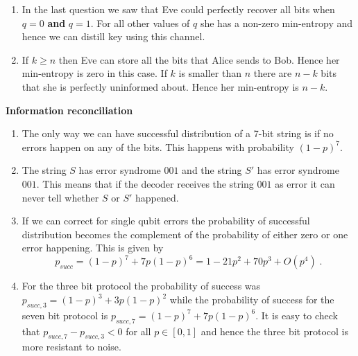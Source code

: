 \begin{exercises}
\begin{enumerate}
\item In the last question we saw that Eve could perfectly recover all bits when \(q=0\) {\bf and} \(q=1\). For all other values of \(q\) she has a non-zero min-entropy and hence we can distill key using this channel.

\item If \(k\geq n\) then Eve can store all the bits that Alice sends to Bob. Hence her min-entropy is zero in this case. If \(k\) is smaller than \(n\) there are \(n-k\) bits that she is perfectly uninformed about. Hence her min-entropy is \(n-k\).
\end{enumerate}


\item {\bf Information reconciliation}

\begin{enumerate}
\item The only way we can have successful distribution of a 7-bit string is if no errors happen on any of the bits. This happens with probability \((1-p)^7\).

\item The string \(S\) has error syndrome \(001\) and the string \(S'\) has error syndrome \(001\). This means that if the decoder receives the string \(001\) as error it can never tell whether \(S\) or \(S'\) happened.

\item If we can correct for single qubit errors the probability of successful distribution becomes the complement of the probability of either zero or one error happening. This is given by \[p_{succ} = (1-p)^7 + 7p(1-p)^6 = 1 - 21p^2 + 70p^3 + O(p^4)\;.\]

\item For the three bit protocol the probability of success was \(p_{succ,3} = (1-p)^3 + 3p(1-p)^2\) while the probability of success for the seven bit protocol is \(p_{succ,7} = (1-p)^7 + 7p(1-p)^6\). It is easy to check that \(p_{succ,7} - p_{succ,3} <0\) for all \(p\in [0,1]\) and hence the three bit protocol is more resistant to noise.
\end{enumerate}
\end{exercises}